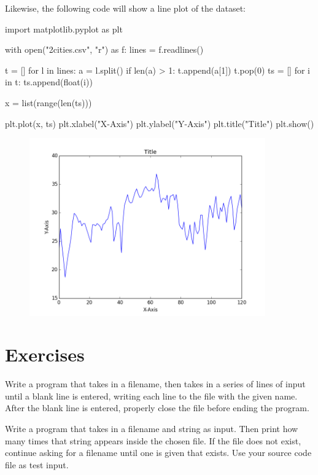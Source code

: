 \documentclass[11pt]{cselabheader}
\begin{document}
Likewise, the following code will show a line plot of the dataset:\\
\begin{python3code}
import matplotlib.pyplot as plt

with open("2cities.csv", "r") as f:
        lines = f.readlines()

t = []
for l in lines:
        a = l.split()
        if len(a) > 1:
                t.append(a[1])
t.pop(0)
ts = []
for i in t:
        ts.append(float(i))

x = list(range(len(ts)))

plt.plot(x, ts)
plt.xlabel("X-Axis")
plt.ylabel("Y-Axis")
plt.title("Title")
plt.show()
\end{python3code}

\begin{figure}[h]
  \centering
  \includegraphics[width=4.0in]{img/line1}
\end{figure}

\pagebreak
\section{Exercises}
\label{sec:ex}

\begin{ex}[save.py] Write a program that takes in a filename, then takes in
  a series of lines of input until a blank line is entered, writing each line to
  the file with the given name. After the blank line is entered, properly close
  the file before ending the program.  
\end{ex}

\begin{ex} Write a program that
  takes in a filename and string as input. Then print how many times that string
  appears inside the chosen file. If the file does not exist, continue asking
  for a filename until one is given that exists. Use your source code file as
  test input.
\end{ex}
\end{document}

